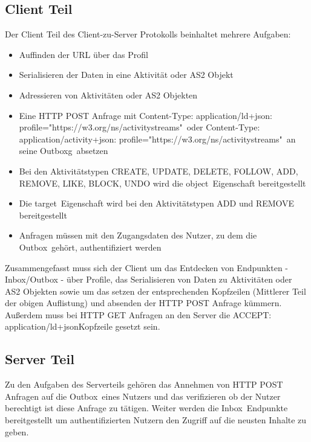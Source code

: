 	\subsection{Client Teil}
		Der Client Teil des Client-zu-Server Protokolls beinhaltet mehrere Aufgaben:
		\begin{itemize}
			\item Auffinden der URL über das Profil
			\item Serialisieren der Daten in eine Aktivität oder AS2 Objekt
			\item Adressieren von Aktivitäten oder AS2 Objekten
			\item Eine HTTP POST Anfrage mit \glqq Content-Type: application/ld+json: profile="https://w3.org/ns/activitystreams"\grqq~oder \glqq Content-Type: application/activity+json: profile="https://w3.org/ns/activitystreams"\grqq~an seine \glqq Outboxg\grqq~absetzen
			\item Bei den Aktivitätstypen CREATE, UPDATE, DELETE, FOLLOW, ADD, REMOVE, LIKE, BLOCK, UNDO wird die \glqq object\grqq~Eigenschaft bereitgestellt
			\item Die \glqq target\grqq~Eigenschaft wird bei den Aktivitätstypen ADD und REMOVE bereitgestellt
			\item Anfragen müssen mit den Zugangsdaten des Nutzer, zu dem die \glqq Outbox\grqq~gehört, authentifiziert werden
		\end{itemize}
		Zusammengefasst muss sich der Client um das Entdecken von Endpunkten - Inbox/Outbox - über Profile, das Serialisieren von Daten zu Aktivitäten oder AS2 Objekten sowie um das setzen der entsprechenden Kopfzeilen (Mittlerer Teil der obigen Auflistung) und absenden der HTTP POST Anfrage kümmern. Außerdem muss bei HTTP GET Anfragen an den Server die \glqq ACCEPT: application/ld+json\grqq Kopfzeile gesetzt sein.

	\subsection{Server Teil} 
		Zu den Aufgaben des Serverteils gehören das Annehmen von HTTP POST Anfragen auf die \glqq Outbox\grqq~eines Nutzers und das verifizieren ob der Nutzer berechtigt ist diese Anfrage zu tätigen. Weiter werden die \glqq Inbox\grqq~Endpunkte bereitgestellt um authentifizierten Nutzern den Zugriff auf die neusten Inhalte zu geben. 
	
